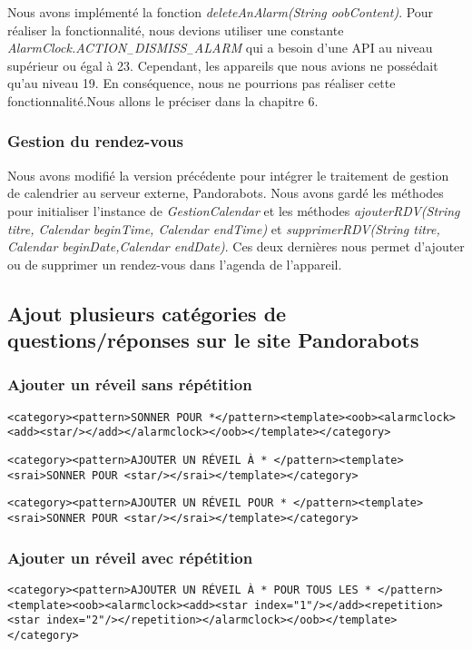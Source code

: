 \indent Nous avons implémenté la fonction \emph{deleteAnAlarm(String oobContent)}. Pour réaliser la fonctionnalité, nous devions utiliser une constante \emph{AlarmClock.ACTION$_-$DISMISS$_-$ALARM} qui a besoin d'une API au niveau supérieur ou égal à 23. Cependant, les appareils que nous avions ne possédait qu'au niveau 19. En conséquence, nous ne pourrions pas réaliser cette fonctionnalité.Nous allons le préciser dans la chapitre 6.

\subsubsection{Gestion du rendez-vous}
\indent Nous avons modifié la version précédente pour intégrer le traitement de gestion de calendrier au serveur externe, Pandorabots. Nous avons gardé les méthodes pour initialiser l'instance de \emph{GestionCalendar} et les méthodes \emph{ajouterRDV(String titre, Calendar beginTime, Calendar endTime)} et \emph{supprimerRDV(String titre, Calendar beginDate,Calendar endDate)}. Ces deux dernières nous permet d'ajouter ou de supprimer un rendez-vous dans l'agenda de l'appareil.

\subsection{Ajout plusieurs catégories de questions/réponses sur le site Pandorabots}
\subsubsection{Ajouter un réveil sans répétition}
\begin{lstlisting}[frame=none,aboveskip=0.5em]
<category><pattern>SONNER POUR *</pattern><template><oob><alarmclock>
<add><star/></add></alarmclock></oob></template></category>
\end{lstlisting}

\begin{lstlisting}[frame=none,aboveskip=0.5em]
<category><pattern>AJOUTER UN RÉVEIL À * </pattern><template><srai>SONNER POUR <star/></srai></template></category>
\end{lstlisting}

\begin{lstlisting}[frame=none,aboveskip=0.5em]
<category><pattern>AJOUTER UN RÉVEIL POUR * </pattern><template><srai>SONNER POUR <star/></srai></template></category>
\end{lstlisting}

\subsubsection{Ajouter un réveil avec répétition}
\begin{lstlisting}[frame=none,aboveskip=0.5em]
<category><pattern>AJOUTER UN RÉVEIL À * POUR TOUS LES * </pattern><template><oob><alarmclock><add><star index="1"/></add><repetition><star index="2"/></repetition></alarmclock></oob></template></category>
\end{lstlisting}

